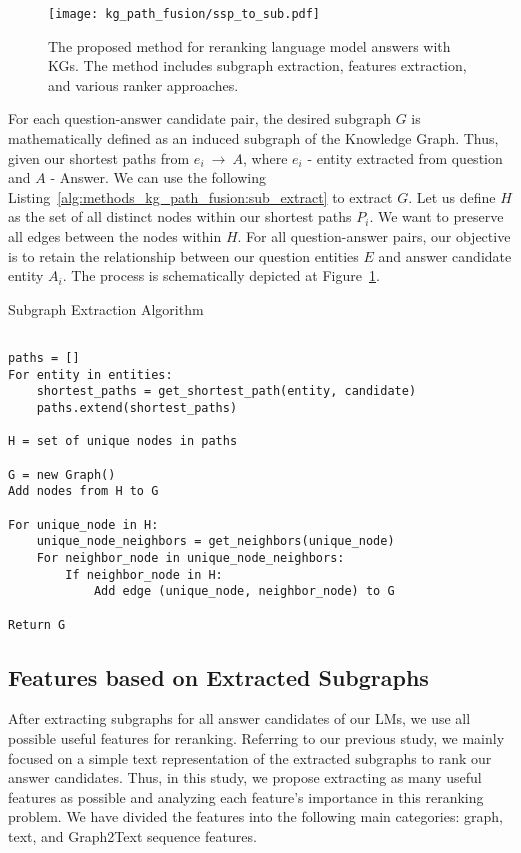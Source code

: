 \begin{figure}[htb]
    \centering
    \texttt{[image: kg\_path\_fusion/ssp\_to\_sub.pdf]}
    \caption{The proposed method for reranking language model answers with KGs. The method includes subgraph extraction, features extraction, and various ranker approaches.}
    \label{fig:methods_kg_path_fusion:subgraph_construction_example}
\end{figure}

For each question-answer candidate pair, the desired subgraph $G$ is mathematically defined as an induced subgraph of the Knowledge Graph. Thus, given our shortest paths from $e_i~\rightarrow~A$, where $e_i$ - entity extracted from question and $A$ - Answer. We can use the following Listing~\ref{alg:methods_kg_path_fusion:sub_extract} to extract $G$. Let us define $H$ as the set of all distinct nodes within our shortest paths $P_i$. We want to preserve all edges between the nodes within $H$. For all question-answer pairs, our objective is to retain the relationship between our question entities $E$ and answer candidate entity $A_i$. The process is schematically depicted at Figure~\ref{fig:methods_kg_path_fusion:subgraph_construction_example}.

\begin{ListingEnv}[p]
    \centering %
    \caption{Subgraph Extraction Algorithm} 
    \label{alg:methods_kg_path_fusion:sub_extract} 
    \begin{lstlisting}[basicstyle=\fontsize{10pt}{12pt}\selectfont\ttfamily] % Smaller font for code Require: entities, candidate

paths = []
For entity in entities:
    shortest_paths = get_shortest_path(entity, candidate)
    paths.extend(shortest_paths)

H = set of unique nodes in paths

G = new Graph()
Add nodes from H to G

For unique_node in H:
    unique_node_neighbors = get_neighbors(unique_node)
    For neighbor_node in unique_node_neighbors:
        If neighbor_node in H:
            Add edge (unique_node, neighbor_node) to G

Return G
    \end{lstlisting}
\end{ListingEnv}


\subsection{Features based on Extracted Subgraphs} \label{sec:methods_kg_path_fusion:subgraph_features}
After extracting subgraphs for all answer candidates of our LMs, we use all possible useful features for reranking. Referring to our previous study, we mainly focused on a simple text representation of the extracted subgraphs to rank our answer candidates. Thus, in this study, we propose extracting as many useful features as possible and analyzing each feature's importance in this reranking problem. We have divided the features into the following main categories: graph, text, and Graph2Text sequence features. 

